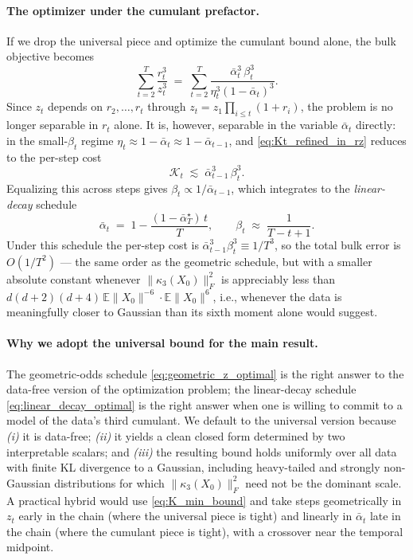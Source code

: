 \documentclass[11pt]{article}
\def\E{\mathbb{E}}
\begin{document}
\paragraph{The optimizer under the cumulant prefactor.} If we drop the universal piece and optimize the cumulant bound alone, the bulk objective becomes
\[
\sum_{t=2}^T \frac{r_t^3}{z_t^3}
\;=\;
\sum_{t=2}^T \frac{\bar\alpha_t^3\,\beta_t^3}{\eta_t^3(1-\bar\alpha_t)^3}.
\]
Since \(z_t\) depends on \(r_2,\ldots,r_t\) through \(z_t=z_1\prod_{i\le t}(1+r_i)\), the problem is no longer separable in \(r_t\) alone. It is, however, separable in the variable \(\bar\alpha_t\) directly: in the small-\(\beta_t\) regime \(\eta_t\approx 1-\bar\alpha_t\approx 1-\bar\alpha_{t-1}\), and \eqref{eq:Kt_refined_in_rz} reduces to the per-step cost
\begin{equation}
\label{eq:cumulant_per_step}
\mathcal K_t \;\lesssim\; \bar\alpha_{t-1}^3\,\beta_t^3.
\end{equation}
Equalizing this across steps gives \(\beta_t\propto 1/\bar\alpha_{t-1}\), which integrates to the \emph{linear-decay} schedule
\begin{equation}
\label{eq:linear_decay_optimal}
\bar\alpha_t \;=\; 1-\frac{(1-\bar\alpha_T^\star)\,t}{T},
\qquad
\beta_t \;\approx\; \frac{1}{T-t+1}.
\end{equation}
Under this schedule the per-step cost is \(\bar\alpha_{t-1}^3\beta_t^3\equiv 1/T^3\), so the total bulk error is \(O(1/T^2)\) --- the same order as the geometric schedule, but with a smaller absolute constant whenever \(\|\kappa_3(X_0)\|_F^2\) is appreciably less than \(d(d+2)(d+4)\,\E\|X_0\|^{-6}\cdot\E\|X_0\|^6\), i.e., whenever the data is meaningfully closer to Gaussian than its sixth moment alone would suggest.

\paragraph{Why we adopt the universal bound for the main result.} The geometric-odds schedule \eqref{eq:geometric_z_optimal} is the right answer to the data-free version of the optimization problem; the linear-decay schedule \eqref{eq:linear_decay_optimal} is the right answer when one is willing to commit to a model of the data's third cumulant. We default to the universal version because \emph{(i)} it is data-free; \emph{(ii)} it yields a clean closed form determined by two interpretable scalars; and \emph{(iii)} the resulting bound holds uniformly over all data with finite KL divergence to a Gaussian, including heavy-tailed and strongly non-Gaussian distributions for which \(\|\kappa_3(X_0)\|_F^2\) need not be the dominant scale. A practical hybrid would use \eqref{eq:K_min_bound} and take steps geometrically in \(z_t\) early in the chain (where the universal piece is tight) and linearly in \(\bar\alpha_t\) late in the chain (where the cumulant piece is tight), with a crossover near the temporal midpoint.
\end{document}
